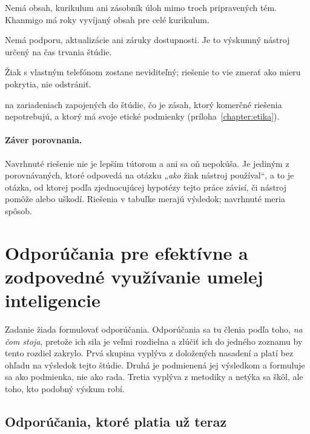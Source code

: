 \begin{description}[leftmargin=0.6cm, nosep]
    \item[\textbf{Neučí.}] Nemá obsah, kurikulum ani zásobník úloh mimo troch pripravených tém. Khanmigo má roky vyvíjaný obsah pre celé kurikulum.
    \item[\textbf{Nie je produkt.}] Nemá podporu, aktualizácie ani záruky dostupnosti. Je to výskumný nástroj určený na čas trvania štúdie.
    \item[\textbf{Nezachytí použitie mimo školského zariadenia.}] Žiak s vlastným telefónom zostane neviditeľný; riešenie to vie zmerať ako mieru pokrytia, nie odstrániť.
    \item[\textbf{Vyžaduje inštaláciu certifikačnej autority}] na zariadeniach zapojených do štúdie, čo je zásah, ktorý komerčné riešenia nepotrebujú, a ktorý má svoje etické podmienky (príloha~\ref{chapter:etika}).
\end{description}

\paragraph{Záver porovnania.} Navrhnuté riešenie nie je lepším tútorom a ani sa oň nepokúša. Je jediným z porovnávaných, ktoré odpovedá na otázku „\emph{ako} žiak nástroj používal“, a to je otázka, od ktorej podľa zjednocujúcej hypotézy tejto práce závisí, či nástroj pomôže alebo uškodí. Riešenia v tabuľke merajú výsledok; navrhnuté meria spôsob.


\section{Odporúčania pre efektívne a zodpovedné využívanie umelej inteligencie}
\label{sec:odporucania}

Zadanie žiada formulovať odporúčania. Odporúčania sa tu členia podľa toho, \emph{na čom stoja}, pretože ich sila je veľmi rozdielna a zlúčiť ich do jedného zoznamu by tento rozdiel zakrylo. Prvá skupina vyplýva z doložených nasadení a platí bez ohľadu na výsledok tejto štúdie. Druhá je podmienená jej výsledkom a formuluje sa ako podmienka, nie ako rada. Tretia vyplýva z metodiky a netýka sa škôl, ale toho, kto podobný výskum robí.

\subsection{Odporúčania, ktoré platia už teraz}

